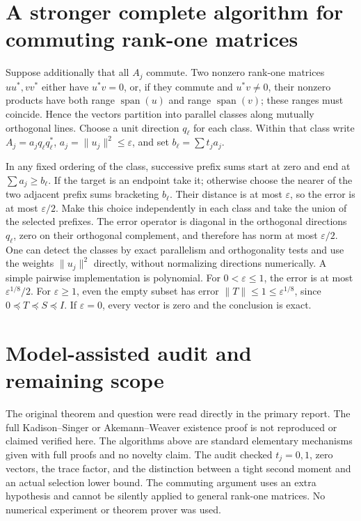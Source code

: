 \documentclass[11pt]{article}
\begin{document}
\section{A stronger complete algorithm for commuting rank-one matrices}
Suppose additionally that all $A_j$ commute. Two nonzero rank-one matrices
$uu^*,vv^*$ either have $u^*v=0$, or, if they commute and $u^*v\ne0$,
their nonzero products have both range $\operatorname{span}(u)$ and range
$\operatorname{span}(v)$; these ranges must coincide. Hence the vectors
partition into parallel classes along mutually orthogonal lines. Choose a
unit direction $q_\ell$ for each class. Within that class write
$A_j=a_j q_\ell q_\ell^*$, $a_j=\|u_j\|^2\le\varepsilon$, and set
$b_\ell=\sum t_j a_j$.

In any fixed ordering of the class, successive prefix sums start at zero
and end at $\sum a_j\ge b_\ell$. If the target is an endpoint take it;
otherwise choose the nearer of the two adjacent prefix sums bracketing
$b_\ell$. Their distance is at most $\varepsilon$, so the error is at most
$\varepsilon/2$. Make this choice independently in each class and take the
union of the selected prefixes. The error operator is diagonal in the
orthogonal directions $q_\ell$, zero on their orthogonal complement, and
therefore has norm at most $\varepsilon/2$.
One can detect the classes by exact parallelism and orthogonality tests and
use the weights $\|u_j\|^2$ directly, without normalizing directions
numerically. A simple pairwise implementation is polynomial.
For $0<\varepsilon\le1$, the error is at most
$\varepsilon^{1/8}/2$. For $\varepsilon\ge1$, even the empty subset has
error $\|T\|\le1\le\varepsilon^{1/8}$, since $0\preceq T\preceq S\preceq I$.
If $\varepsilon=0$, every vector is zero and the conclusion is exact.

\section{Model-assisted audit and remaining scope}
The original theorem and question were read directly in the primary report.
The full Kadison--Singer or Akemann--Weaver existence proof is not reproduced
or claimed verified here. The algorithms above are standard elementary
mechanisms given with full proofs and no novelty claim. The audit checked
$t_j=0,1$, zero vectors, the trace factor, and the distinction between a tight
second moment and an actual selection lower bound. The commuting argument
uses an extra hypothesis and cannot be silently applied to general rank-one
matrices. No numerical experiment or theorem prover was used.
\end{document}
